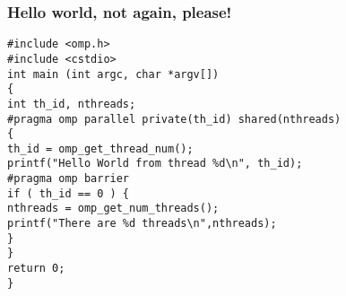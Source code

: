 \documentclass{beamer}
\begin{document}
\begin{frame}
\frametitle{Hello world, not again, please!}

\begin{block}{}


















\begin{verbatim}
#include <omp.h>
#include <cstdio>
int main (int argc, char *argv[])
{
int th_id, nthreads;
#pragma omp parallel private(th_id) shared(nthreads)
{
th_id = omp_get_thread_num();
printf("Hello World from thread %d\n", th_id);
#pragma omp barrier
if ( th_id == 0 ) {
nthreads = omp_get_num_threads();
printf("There are %d threads\n",nthreads);
}
}
return 0;
}

\end{verbatim}


\end{block}
\end{frame}
\end{document}
